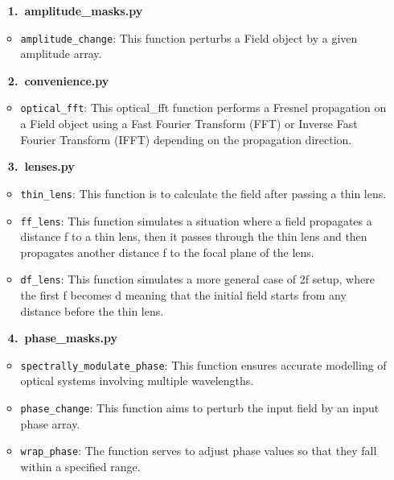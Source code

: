 \documentclass[a4paper,12pt]{report}
\begin{document}
\begin{itemize}[itemsep=1em,leftmargin=*]
  \item[\large\bfseries 1.\ amplitude\_masks.py]
    \begin{itemize}[itemsep=0.5em]
      \item \texttt{amplitude\_change}: This function perturbs a Field object by a given amplitude array.
    \end{itemize}

  \item[\large\bfseries 2.\ convenience.py]
    \begin{itemize}[itemsep=0.5em]
      \item \texttt{optical\_fft}: This optical\_fft function performs a Fresnel propagation on a Field object using a Fast Fourier Transform (FFT) or Inverse Fast Fourier Transform (IFFT) depending on the propagation direction.
    \end{itemize}

  \item[\large\bfseries 3.\ lenses.py]
    \begin{itemize}[itemsep=0.5em]
      \item \texttt{thin\_lens}: This function is to calculate the field after passing a thin lens.
      \item \texttt{ff\_lens}: This function simulates a situation where a field propagates a distance f to a thin lens, then it passes through the thin lens and then propagates another distance f to the focal plane of the lens.
      \item \texttt{df\_lens}: This function simulates a more general case of 2f setup, where the first f becomes d meaning that the initial field starts from any distance before the thin lens.
    \end{itemize}

  \item[\large\bfseries 4.\ phase\_masks.py]
    \begin{itemize}[itemsep=0.5em]
      \item \texttt{spectrally\_modulate\_phase}: This function ensures accurate modelling of optical systems involving multiple wavelengths.
      \item \texttt{phase\_change}: This function aims to perturb the input field by an input phase array.
      \item \texttt{wrap\_phase}: The function serves to adjust phase values so that they fall within a specified range.
    \end{itemize}


\end{itemize}
\end{document}

